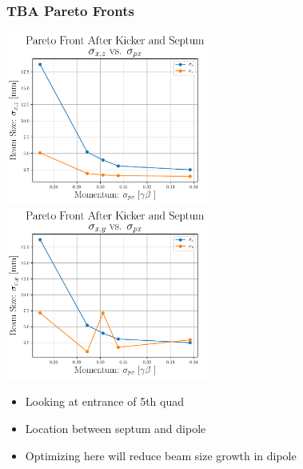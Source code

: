 \documentclass[professionalfonts,t]{beamer}
\begin{document}
\begin{frame}
	\frametitle{TBA Pareto Fronts}
	\includegraphics[width=0.5\textwidth]{../../tex/images/xz_vs_px_pareto_front_Q5}%
	\includegraphics[width=0.5\textwidth]{../../tex/images/xy_vs_px_pareto_front_Q5}%
	\begin{itemize}
		\item Looking at entrance of 5th quad
		\item Location between septum and dipole
		\item Optimizing here will reduce beam size growth in dipole
	\end{itemize}
\end{frame}
\end{document}
